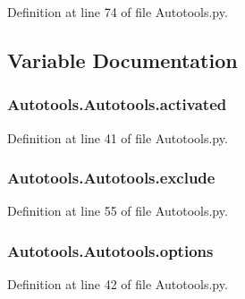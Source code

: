 Definition at line 74 of file Autotools.\-py.



\subsection{Variable Documentation}
\hypertarget{group___tools_ga6bbb714a91bc8b6fe749326772b073b3}{
\subsubsection[{activated}]{\setlength{\rightskip}{0pt plus 5cm}Autotools.\-Autotools.\-activated}}\label{group___tools_ga6bbb714a91bc8b6fe749326772b073b3}


Definition at line 41 of file Autotools.\-py.

\hypertarget{group___tools_gaee37d9789ea22ee310ebc357cd721b7f}{
\subsubsection[{exclude}]{\setlength{\rightskip}{0pt plus 5cm}Autotools.\-Autotools.\-exclude}}\label{group___tools_gaee37d9789ea22ee310ebc357cd721b7f}


Definition at line 55 of file Autotools.\-py.

\hypertarget{group___tools_ga8b348e19f0a7104bde9c43c3a6ed695d}{
\subsubsection[{options}]{\setlength{\rightskip}{0pt plus 5cm}Autotools.\-Autotools.\-options}}\label{group___tools_ga8b348e19f0a7104bde9c43c3a6ed695d}


Definition at line 42 of file Autotools.\-py.

